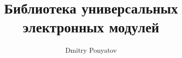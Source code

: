


% 

\title{Библиотека универсальных электронных модулей \odurino}

\author{Dmitry Ponyatov }



\maketitle

\tableofcontents




